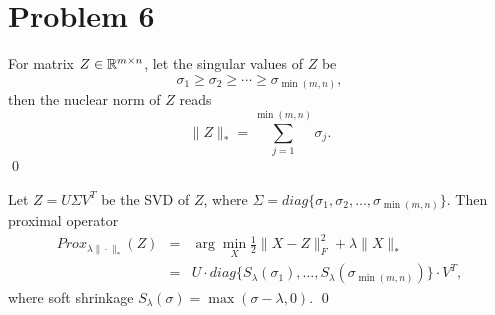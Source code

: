 \documentclass{article}
\begin{document}
\section*{Problem 6}
\begin{myproof} For matrix $Z\in \mathbb{R}^{m\times n}$, let the singular values of $Z$ be
	\begin{equation}
	\sigma_1\geq\sigma_2\geq\cdots\geq\sigma_{\min(m,n)},
	\end{equation}
	then the nuclear norm of $Z$ reads
	\begin{equation}
	\|Z\|_\ast = \sum_{j=1}^{\min(m,n)}\sigma_j.
	\end{equation}
\qed
\end{myproof}
\begin{myproof}
	Let $Z=U\Sigma V^T$ be the SVD of $Z$, where $\Sigma = diag\{\sigma_1,\sigma_2,\ldots,\sigma_{\min(m,n)}\}$. Then proximal operator
	\begin{eqnarray}
	Prox_{\lambda\|\cdot\|_\ast}(Z) &=& \arg\min_X \frac{1}{2}\|X-Z\|_F^2+\lambda\|X\|_\ast\\
	&=&U\cdot diag\{S_\lambda(\sigma_1),\ldots, S_\lambda(\sigma_{\min(m,n)})\}\cdot V^T,
	\end{eqnarray}
	where soft shrinkage $S_\lambda(\sigma)=\max(\sigma-\lambda,0)$.
	\qed
\end{myproof}
\end{document}
